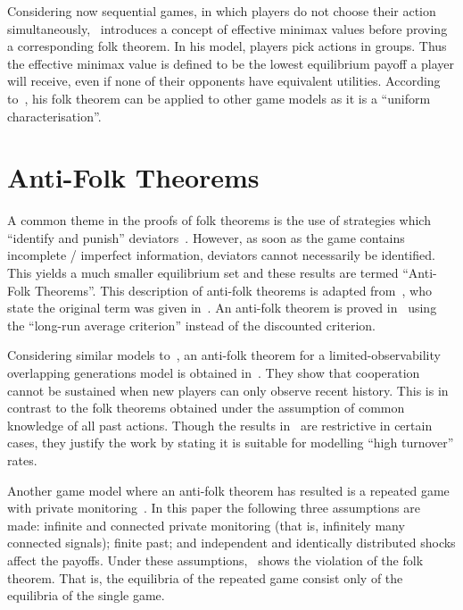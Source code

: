 Considering now sequential games, in which players do not choose their action
simultaneously,~\cite{Wen2002} introduces a concept of effective minimax values
before proving a corresponding folk theorem. In his model, players pick actions
in groups. Thus the effective minimax value is defined to be the lowest
equilibrium payoff a player will receive, even if none of their opponents have
equivalent utilities. According to~\cite{Wen2002}, his folk theorem can be
applied to other game models as it is a ``uniform characterisation''.


\section{Anti-Folk Theorems}\label{sec:Anti-Folk_Theorems}
A common theme in the proofs of folk theorems is the use of strategies which
``identify and punish'' deviators~\cite{Masso1989}. However, as soon as the game
contains incomplete / imperfect information, deviators cannot necessarily be
identified. This yields a much smaller equilibrium set and these results are
termed ``Anti-Folk Theorems''. This description of anti-folk theorems is adapted
from~\cite{Masso1989}, who state the original term was given
in~\cite{Dubey1984,Kaneko1982}. An anti-folk theorem is proved
in~\cite{Masso1989} using the ``long-run average criterion'' instead of the
discounted criterion.

Considering similar models to~\cite{Bhaskar1998, Gossner1996}, an anti-folk theorem for a limited-observability overlapping generations
model is obtained in~\cite{Yoon2001}. They show that cooperation cannot be
sustained when new players can only observe recent history. This is in contrast
to the folk theorems obtained under
the assumption of common knowledge of all past actions. Though the results
in~\cite{Yoon2001} are
restrictive in certain cases, they justify the work by stating it is suitable
for modelling ``high turnover'' rates.

Another game model where an anti-folk theorem has resulted is a repeated game
with private monitoring~\cite{Peski2012}. In this paper the following
three assumptions are made: infinite and connected private monitoring (that is,
infinitely many connected signals); finite past; and independent and identically
distributed shocks affect the payoffs. Under these assumptions,~\cite{Peski2012}
shows the violation of the folk theorem. That is, the equilibria of the repeated
game consist only of the equilibria of the single game.


